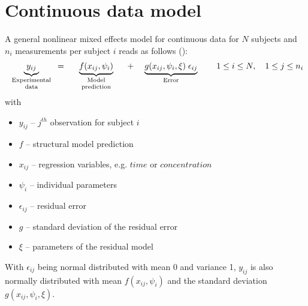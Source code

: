 \section{Continuous data model}
\label{sec:continuousDataModel}
A general nonlinear mixed effects model for continuous data for $N$ subjects and $n_i$ measurements per subject $i$ reads as follows (\cite{Lavielle:2012b}):
\begin{align}
 \underbrace{ y_{ij}}_{\text{\parbox{2cm}{\centering Experimental \\[-4pt]  data}}} =
 \underbrace{ f(x_{ij}, \psi_{i})}_{\text{\parbox{2.5cm}{\centering Model \\[-4pt]  prediction}}} + 
 \underbrace{ g(x_{ij}, \psi_{i}, \xi) \; \epsilon_{ij}}_{\text{\parbox{3cm}{\centering Error}}} 
\quad 1\le i \le N, \quad 1\le j \le n_i \label{eq:nlmeModel}
 \end{align}
with
\begin{itemize}
\item
$y_{ij}$ -- $j^{th}$ observation for subject $i$
\item
$f$ -- structural model prediction
\item
$x_{ij}$ -- regression variables, e.g. $time$ or $concentration$
\item
$\psi_{i}$ -- individual parameters
\item
$\epsilon_{ij}$ -- residual error
\item
$g$ -- standard deviation of the residual error
\item 
$\xi$ -- parameters of the residual model
\end{itemize}
With $\epsilon_{ij}$ being normal distributed with mean 0 and variance 1, $y_{ij}$ is also normally distributed with mean $ f(x_{ij}, \psi_{i})$ and the standard deviation $g(x_{ij}, \psi_{i}, \xi)$. 
